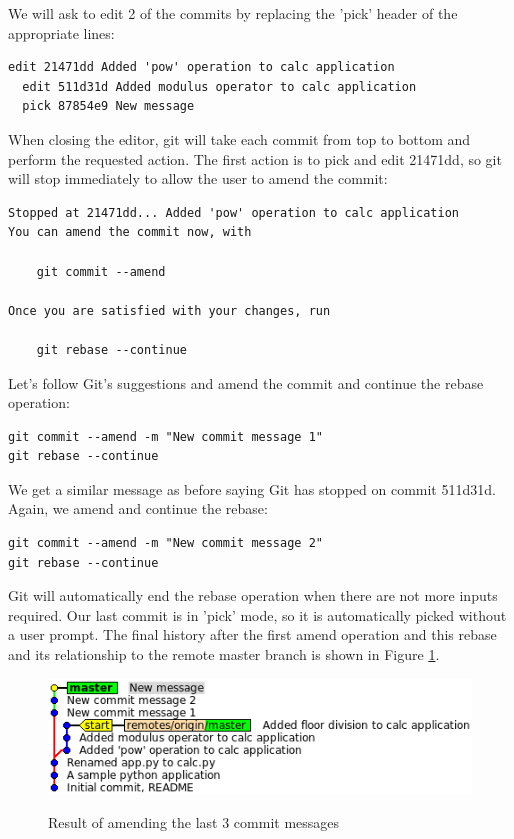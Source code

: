 \documentclass{../common/tufte-latex/tufte-handout}
\begin{document}
We will ask to edit 2 of the commits by replacing the 'pick' header of the appropriate lines:

\begin{lstlisting}[style=BashInputStyle]
  edit 21471dd Added 'pow' operation to calc application
  edit 511d31d Added modulus operator to calc application
  pick 87854e9 New message
\end{lstlisting}

When closing the editor, git will take each commit from top to bottom and perform the requested action.
The first action is to pick and edit 21471dd, so git will stop immediately to allow the user to amend the commit:

\begin{lstlisting}[style=BashInputStyle]
Stopped at 21471dd... Added 'pow' operation to calc application
You can amend the commit now, with

	git commit --amend

Once you are satisfied with your changes, run

	git rebase --continue
\end{lstlisting}

Let's follow Git's suggestions and amend the commit and continue the rebase operation:

\begin{lstlisting}[style=BashInputStyle]
git commit --amend -m "New commit message 1"
git rebase --continue
\end{lstlisting}

We get a similar message as before saying Git has stopped on commit 511d31d.
Again, we amend and continue the rebase:

\begin{lstlisting}[style=BashInputStyle]
git commit --amend -m "New commit message 2"
git rebase --continue
\end{lstlisting}

Git will automatically end the rebase operation when there are not more inputs required.
Our last commit is in 'pick' mode, so it is automatically picked without a user prompt.
The final history after the first amend operation and this rebase and its relationship to the remote master branch is shown in Figure \ref{fig:gitrebase-amend}.

\begin{figure}%
  \centering
  \includegraphics[width=0.75\linewidth]{gitrebase-amend.png}
  \label{fig:gitrebase-amend}
  \caption{Result of amending the last 3 commit messages}
\end{figure}
\end{document}
